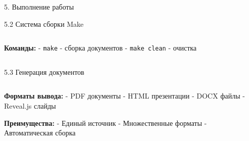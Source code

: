 \documentclass[
  ignorenonframetext,
  aspectratio=169,
]{beamer}
\begin{document}
\begin{frame}[fragile]{5. Выполнение работы}
\begin{block}{5.2 Система сборки Make}
\begin{columns}[c]
\begin{column}{0.6\textwidth}
\textbf{Команды:} - \texttt{make} - сборка документов -
\texttt{make\ clean} - очистка
\end{column}

\begin{column}{0.4\textwidth}
\end{column}
\end{columns}
\end{block}

\begin{block}{5.3 Генерация документов}
\label{ux433ux435ux43dux435ux440ux430ux446ux438ux44f-ux434ux43eux43aux443ux43cux435ux43dux442ux43eux432}
\begin{columns}[c]
\begin{column}{0.6\textwidth}
\textbf{Форматы вывода:} - PDF документы - HTML презентации - DOCX файлы
- Reveal.js слайды

\textbf{Преимущества:} - Единый источник - Множественные форматы -
Автоматическая сборка
\end{column}

\begin{column}{0.4\textwidth}
\end{column}
\end{columns}
\end{block}
\end{frame}
\end{document}
